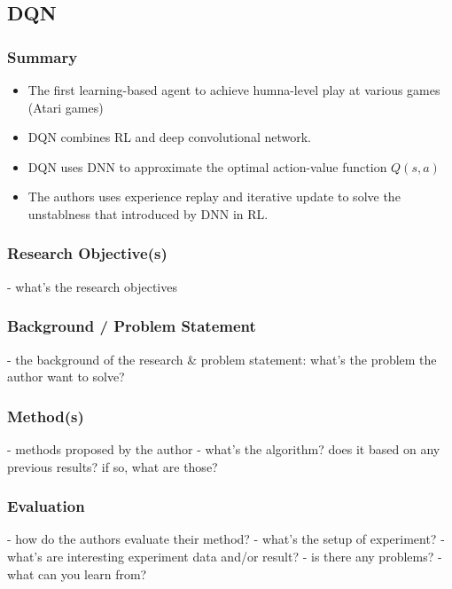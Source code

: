 \documentclass[lang=en,mode=normal,device=normal,color=blue,12pt]{elegantnote}
\DeclareMathOperator*{\1}{\mathbbm{1}}
\begin{document}
\newpage
\subsection{DQN}

\subsubsection{Summary}
\begin{itemize}
\item The first learning-based agent to achieve humna-level play at various games (Atari games)
\item DQN combines RL and deep convolutional network.
\item DQN uses DNN to approximate the optimal action-value function $Q(s,a)$
\item The authors uses experience replay and iterative update to solve the unstablness that introduced by DNN in RL.
\end{itemize}



\subsubsection{Research Objective(s)}

- what's the research objectives

\subsubsection{Background / Problem Statement}

- the background of the research \& problem statement: what's the problem the author want to solve?

\subsubsection{Method(s)}

- methods proposed by the author
- what's the algorithm? does it based on any previous results? if so, what are those?

\subsubsection{Evaluation}

- how do the authors evaluate their method?
- what's the setup of experiment?
- what's are interesting experiment data and/or result?
- is there any problems?
- what can you learn from?
\end{document}
